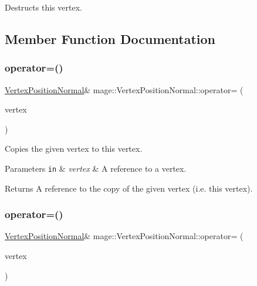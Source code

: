 Destructs this vertex. 

\subsection{Member Function Documentation}
\hypertarget{structmage_1_1_vertex_position_normal_a43c666c745b5807afddf87049ace0ef1}{}\label{structmage_1_1_vertex_position_normal_a43c666c745b5807afddf87049ace0ef1} 
\subsubsection{\texorpdfstring{operator=()}{operator=()}\hspace{0.1cm}{\footnotesize\ttfamily [1/2]}}
{\footnotesize\ttfamily \hyperlink{structmage_1_1_vertex_position_normal}{Vertex\+Position\+Normal}\& mage\+::\+Vertex\+Position\+Normal\+::operator= (\begin{DoxyParamCaption}\item[{const \hyperlink{structmage_1_1_vertex_position_normal}{Vertex\+Position\+Normal} \&}]{vertex }\end{DoxyParamCaption})\hspace{0.3cm}{\ttfamily [default]}}

Copies the given vertex to this vertex.


\begin{DoxyParams}[1]{Parameters}
\mbox{\tt in}  & {\em vertex} & A reference to a vertex. \\
\hline
\end{DoxyParams}
\begin{DoxyReturn}{Returns}
A reference to the copy of the given vertex (i.\+e. this vertex). 
\end{DoxyReturn}
\hypertarget{structmage_1_1_vertex_position_normal_acd4c5c78fba38ea8ea61f8d508ce10a3}{}\label{structmage_1_1_vertex_position_normal_acd4c5c78fba38ea8ea61f8d508ce10a3} 
\subsubsection{\texorpdfstring{operator=()}{operator=()}\hspace{0.1cm}{\footnotesize\ttfamily [2/2]}}
{\footnotesize\ttfamily \hyperlink{structmage_1_1_vertex_position_normal}{Vertex\+Position\+Normal}\& mage\+::\+Vertex\+Position\+Normal\+::operator= (\begin{DoxyParamCaption}\item[{\hyperlink{structmage_1_1_vertex_position_normal}{Vertex\+Position\+Normal} \&\&}]{vertex }\end{DoxyParamCaption})\hspace{0.3cm}{\ttfamily [default]}}

